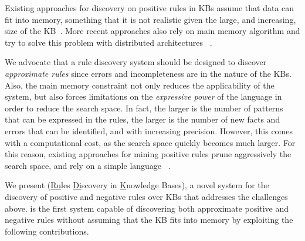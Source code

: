 Existing approaches for discovery on positive rules in KBs assume that data can fit into memory, something that it is not realistic given the large, and increasing, size of the KB~\cite{abedjan2014amending,galarraga2015fast}. More recent approaches also rely on main memory algorithm and try to solve this problem with distributed architectures ~\cite{Chen:2016,DBLP:conf/sigmod/FaridRIHC16}.




We advocate that a rule discovery system should be designed to discover {\em approximate rules} since errors and incompleteness are in the nature of the KBs. Also, the main memory constraint not only reduces the applicability of the system, but also forces limitations on the {\em expressive power} of the language in order to reduce the search space.
In fact, the larger is the number of patterns that can be expressed in the rules, %
the larger is the number of new facts and errors that can be identified, and with increasing precision. However, this comes with a computational cost, as the search space quickly becomes much larger. For this reason, existing approaches for mining positive rules prune aggressively the search space, and rely on a simple language%
~\cite{Chen:2016,abedjan2014amending,galarraga2015fast}.

\vspace{1ex}
We present \krd (\underline{Ru}les \underline{Di}scovery in \underline{K}nowledge Bases), a novel system for the discovery of positive and negative rules %
over KBs that addresses the challenges above.  
\krd is the first system capable of discovering both approximate positive and negative rules without
assuming that the KB fits into memory by exploiting the following contributions.

